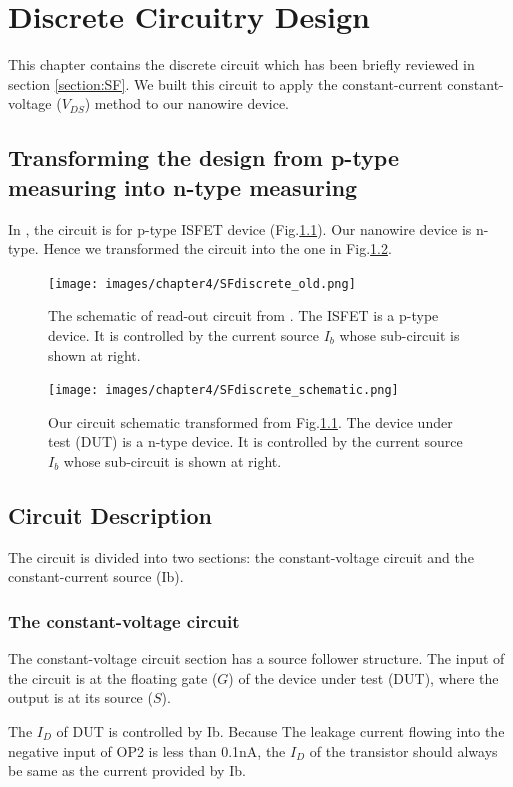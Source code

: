 \chapter{Discrete Circuitry Design}
This chapter contains the discrete circuit which has been briefly reviewed in section \ref{section:SF}.
We built this circuit to apply the constant-current constant-voltage ($V_{DS}$) method to our nanowire device.

\section{Transforming the design from p-type measuring into n-type measuring}
In \cite{SF1}, the circuit is for p-type ISFET device (Fig.\ref{fig:SF_schematic_old}).
Our nanowire device is n-type.
Hence we transformed the circuit into the one in Fig.\ref{fig:SF_schematic}.
\begin{figure}[!htbp]
    \centering
    \texttt{[image: images/chapter4/SFdiscrete\_old.png]}
    \caption{The schematic of read-out circuit from \cite{SF1}. The ISFET is a p-type device. It is controlled by the current source $I_b$ whose sub-circuit is shown at right.}
    \label{fig:SF_schematic_old}
\end{figure}
\begin{figure}[!htbp]
    \centering
    \texttt{[image: images/chapter4/SFdiscrete\_schematic.png]}
    \caption{Our circuit schematic transformed from Fig.\ref{fig:SF_schematic_old}. The device under test (DUT) is a n-type device. It is controlled by the current source $I_b$ whose sub-circuit is shown at right.}
    \label{fig:SF_schematic}
\end{figure}


\section{Circuit Description}
The circuit is divided into two sections: the constant-voltage circuit and the constant-current source (Ib).

\subsection*{The constant-voltage circuit}
The constant-voltage circuit section has a source follower structure.
The input of the circuit is at the floating gate ($G$) of the device under test (DUT), where the output is at its source ($S$).

The $I_D$ of DUT is controlled by Ib.
Because The leakage current flowing into the negative input of OP2 is less than 0.1nA, the $I_D$ of the transistor should always be same as the current provided by Ib.

